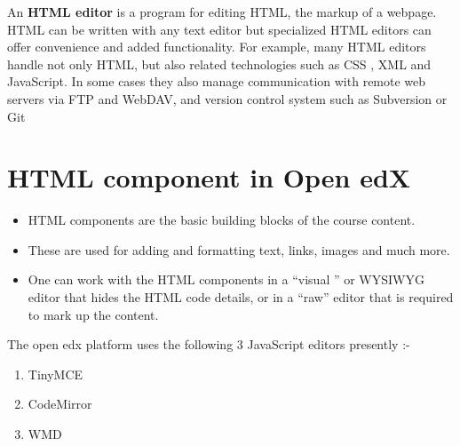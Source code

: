 An \textbf{HTML editor} is a program for editing HTML, the markup of a webpage. HTML can be written
with any text editor but specialized HTML editors can offer convenience and added functionality.
For example, many HTML editors handle not only HTML, but also related technologies such
as CSS , XML and JavaScript. In some cases they also manage communication with remote web
servers via FTP and WebDAV, and version control system such as Subversion or Git

\section{HTML component in Open edX}
\begin{itemize}
	\item HTML components are the basic building blocks of the course content.
	\item These are used for adding and formatting text, links, images and much more.
	\item One can work with the HTML components in a “visual ” or WYSIWYG editor that hides the
HTML code details, or in a “raw” editor that is required to mark up the content.
\end{itemize}
The open edx platform uses the following 3 JavaScript editors presently :-
\begin{enumerate}
	\item TinyMCE
	\item CodeMirror
	\item WMD
\end{enumerate}


